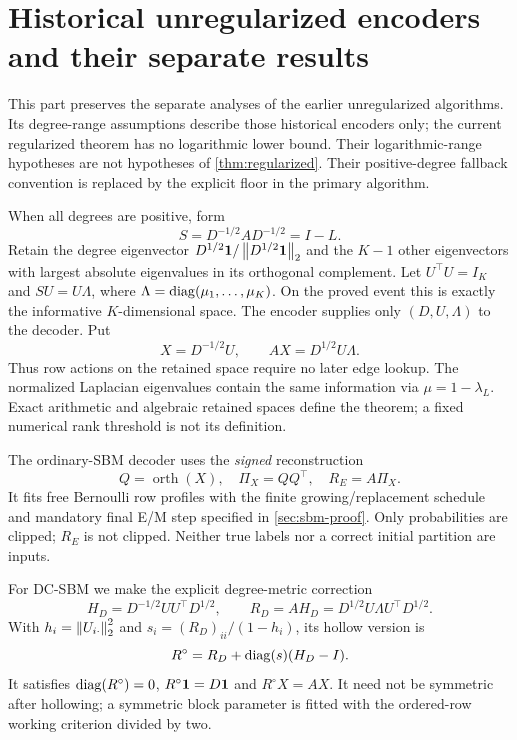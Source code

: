 \section{Historical unregularized encoders and their separate results}\label{sec:historical}

This part preserves the separate analyses of the earlier unregularized
algorithms. Its degree-range assumptions describe those historical
encoders only; the current regularized theorem has no logarithmic
lower bound. Their logarithmic-range hypotheses
are not hypotheses of \cref{thm:regularized}. Their positive-degree
fallback convention is replaced by the explicit floor in the primary
algorithm.

When all degrees are positive, form
\[
 S=D^{-1/2}AD^{-1/2}=I-L.
\]
Retain the degree eigenvector $D^{1/2}\mathbf 1/\left\lVert D^{1/2}\mathbf 1\right\rVert_2$ and the
$K-1$ other eigenvectors with largest absolute eigenvalues in its orthogonal
complement. Let $U^\top U=I_K$ and $SU=U\Lambda$, where
$\Lambda=\operatorname{diag}(\mu_1,\ldots,\mu_K)$. On the proved event this is exactly
the informative $K$-dimensional space. The encoder supplies only
$(D,U,\Lambda)$ to the decoder. Put
\begin{equation}\label{eq:encoder-action}
 X=D^{-1/2}U,\qquad AX=D^{1/2}U\Lambda.
\end{equation}
Thus row actions on the retained space require no later edge lookup.
The normalized Laplacian eigenvalues contain the same information via
$\mu=1-\lambda_L$. Exact arithmetic and algebraic retained spaces define
the theorem; a fixed numerical rank threshold is not its definition.

The ordinary-SBM decoder uses the \emph{signed} reconstruction
\begin{equation}\label{eq:euclidean-decoder}
 Q=\operatorname{orth}(X),\quad \Pi_X=QQ^\top,\quad R_E=A\Pi_X.
\end{equation}
It fits free Bernoulli row profiles with the finite growing/replacement
schedule and mandatory final E/M step specified in
\cref{sec:sbm-proof}. Only probabilities are clipped; $R_E$ is not clipped.
Neither true labels nor a correct initial partition are inputs.

For DC-SBM we make the explicit degree-metric correction
\begin{equation}\label{eq:metric-decoder}
 H_D=D^{-1/2}UU^\top D^{1/2},\qquad
 R_D=AH_D=D^{1/2}U\Lambda U^\top D^{1/2}.
\end{equation}
With $h_i=\left\lVert U_{i\cdot}\right\rVert_2^2$ and
$s_i=(R_D)_{ii}/(1-h_i)$, its hollow version is
\begin{equation}\label{eq:hollow-decoder}
 R^\circ=R_D+\operatorname{diag}(s)(H_D-I).
\end{equation}
It satisfies
$\operatorname{diag}(R^\circ)=0$, $R^\circ\mathbf 1=D\mathbf 1$ and $R^\circ X=AX$.
It need not be symmetric after hollowing; a symmetric block parameter is
fitted with the ordered-row working criterion divided by two.

